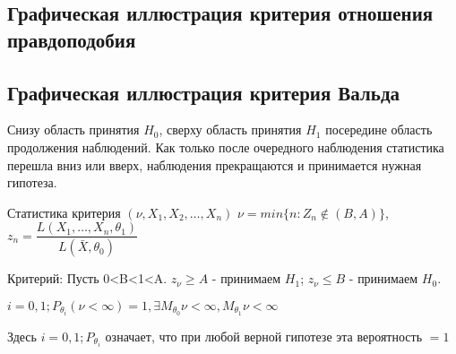 \subsection{Графическая иллюстрация критерия отношения правдоподобия}


\subsection{Графическая иллюстрация критерия Вальда}


Снизу область принятия $H_0$, сверху область принятия $H_1$ посередине область продолжения наблюдений. Как только после очередного наблюдения статистика перешла вниз или вверх, наблюдения прекращаются и принимается нужная гипотеза.

Статистика критерия $(\nu, X_1, X_2, \dots, X_n)$
$\nu = min \{ n : Z_n \notin (B, A) \}$, $z_n = \dfrac{L(X_1, \dots, X_n, \theta_1)}{L(\bar X, \theta_0)}$

Критерий: Пусть 0<B<1<A.
$z_\nu \geqslant A$ - принимаем $H_1$; $z_\nu \leqslant B$ - принимаем $H_0$.

\begin{theorem}
  $i = 0, 1; P_{\theta_i}(\nu < \infty) = 1, \exists M_{\theta_0} \nu < \infty, M_{\theta_1} \nu < \infty$

  Здесь $i = 0, 1; P_{\theta_i}$ означает, что при любой верной гипотезе эта вероятность $=1$
\end{theorem}

